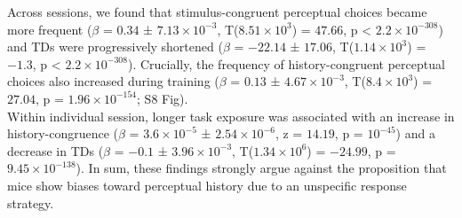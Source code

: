 \documentclass[
]{article}
\begin{document}
Across sessions, we found that stimulus-congruent perceptual choices
became more frequent (\(\beta\) = \(0.34\) ±
\(\ensuremath{7.13\times 10^{-3}}\),
T(\(\ensuremath{8.51\times 10^{3}}\)) = \(47.66\), p < \(\ensuremath{2.2\times 10^{-308}}\)) and TDs
were progressively shortened (\(\beta\) = \(-22.14\) ± \(17.06\),
T(\(\ensuremath{1.14\times 10^{3}}\)) = \(-1.3\), p < \(\ensuremath{2.2\times 10^{-308}}\)). Crucially,
the frequency of history-congruent perceptual choices also increased
during training (\(\beta\) = \(0.13\) ±
\(\ensuremath{4.67\times 10^{-3}}\),
T(\(\ensuremath{8.4\times 10^{3}}\)) = \(27.04\), p =
\(\ensuremath{1.96\times 10^{-154}}\); S8 Fig).\\
Within individual session, longer task exposure was associated with an
increase in history-congruence (\(\beta\) =
\(\ensuremath{3.6\times 10^{-5}}\) ±
\(\ensuremath{2.54\times 10^{-6}}\), z = \(14.19\), p =
\(\ensuremath{10^{-45}}\)) and a decrease in TDs (\(\beta\) = \(-0.1\) ±
\(\ensuremath{3.96\times 10^{-3}}\),
T(\(\ensuremath{1.34\times 10^{6}}\)) = \(-24.99\), p =
\(\ensuremath{9.45\times 10^{-138}}\)). In sum, these findings strongly
argue against the proposition that mice show biases toward perceptual
history due to an unspecific response strategy.
\end{document}
